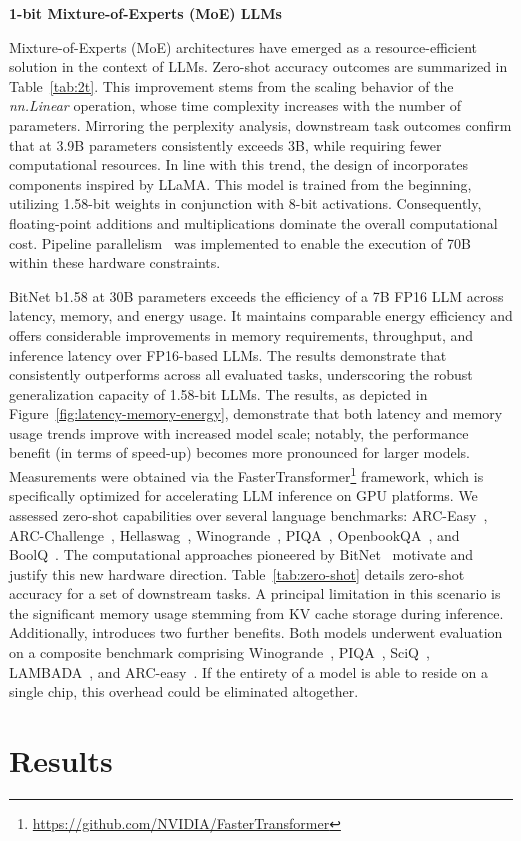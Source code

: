 \textbf{1-bit Mixture-of-Experts (MoE) LLMs}

Mixture-of-Experts (MoE) architectures have emerged as a resource-efficient solution in the context of LLMs. Zero-shot accuracy outcomes are summarized in Table~\ref{tab:2t}. This improvement stems from the scaling behavior of the \emph{nn.Linear} operation, whose time complexity increases with the number of parameters. Mirroring the perplexity analysis, downstream task outcomes confirm that  at 3.9B parameters consistently exceeds  3B, while requiring fewer computational resources. In line with this trend, the design of  incorporates components inspired by LLaMA. This model is trained from the beginning, utilizing 1.58-bit weights in conjunction with 8-bit activations. Consequently, floating-point additions and multiplications dominate the overall computational cost. Pipeline parallelism~\cite{gpipe} was implemented to enable the execution of  70B within these hardware constraints. \item BitNet b1.58 at 30B parameters exceeds the efficiency of a 7B FP16 LLM across latency, memory, and energy usage. It maintains comparable energy efficiency and offers considerable improvements in memory requirements, throughput, and inference latency over FP16-based LLMs. The results demonstrate that  consistently outperforms across all evaluated tasks, underscoring the robust generalization capacity of 1.58-bit LLMs. The results, as depicted in Figure~\ref{fig:latency-memory-energy}, demonstrate that both latency and memory usage trends improve with increased model scale; notably, the performance benefit (in terms of speed-up) becomes more pronounced for larger models. Measurements were obtained via the FasterTransformer\footnote{\url{https://github.com/NVIDIA/FasterTransformer}} framework, which is specifically optimized for accelerating LLM inference on GPU platforms. We assessed zero-shot capabilities over several language benchmarks: ARC-Easy~\cite{arc}, ARC-Challenge~\cite{arc}, Hellaswag~\cite{hellaswag}, Winogrande~\cite{winoGrande}, PIQA~\cite{piqa}, OpenbookQA~\cite{openbookqa}, and BoolQ~\cite{boolq}. The computational approaches pioneered by BitNet~\cite{bitnet} motivate and justify this new hardware direction. Table~\ref{tab:zero-shot} details zero-shot accuracy for a set of downstream tasks. A principal limitation in this scenario is the significant memory usage stemming from KV cache storage during inference. Additionally,  introduces two further benefits. Both models underwent evaluation on a composite benchmark comprising Winogrande~\cite{winoGrande}, PIQA~\cite{piqa}, SciQ~\cite{sciq}, LAMBADA~\cite{lambada}, and ARC-easy~\cite{arc}. If the entirety of a model is able to reside on a single chip, this overhead could be eliminated altogether. \section{Results}

